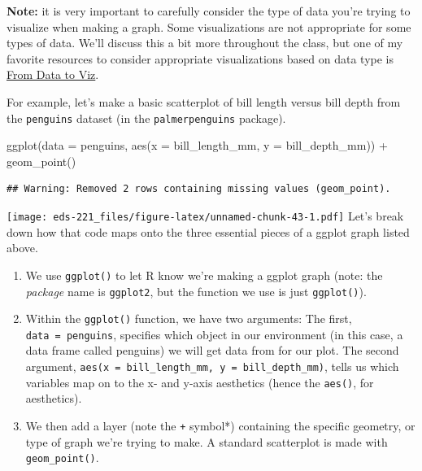 \documentclass[
]{book}
\newenvironment{Shaded}{\begin{snugshade}}{\end{snugshade}}
\newcommand{\AttributeTok}[1]{\textcolor[rgb]{0.77,0.63,0.00}{#1}}
\newcommand{\FunctionTok}[1]{\textcolor[rgb]{0.00,0.00,0.00}{#1}}
\newcommand{\NormalTok}[1]{#1}
\newcommand{\SpecialCharTok}[1]{\textcolor[rgb]{0.00,0.00,0.00}{#1}}
\providecommand{\tightlist}{%
  \setlength{\itemsep}{0pt}\setlength{\parskip}{0pt}}
\begin{document}
\textbf{Note:} it is very important to carefully consider the type of data you're trying to visualize when making a graph. Some visualizations are not appropriate for some types of data. We'll discuss this a bit more throughout the class, but one of my favorite resources to consider appropriate visualizations based on data type is \href{data-to-viz.com}{From Data to Viz}.

For example, let's make a basic scatterplot of bill length versus bill depth from the \texttt{penguins} dataset (in the \texttt{palmerpenguins} package).

\begin{Shaded}
\begin{Highlighting}[]
\FunctionTok{ggplot}\NormalTok{(}\AttributeTok{data =}\NormalTok{ penguins, }\FunctionTok{aes}\NormalTok{(}\AttributeTok{x =}\NormalTok{ bill\_length\_mm, }\AttributeTok{y =}\NormalTok{ bill\_depth\_mm)) }\SpecialCharTok{+}
  \FunctionTok{geom\_point}\NormalTok{()}
\end{Highlighting}
\end{Shaded}

\begin{verbatim}
## Warning: Removed 2 rows containing missing values (geom_point).
\end{verbatim}

\texttt{[image: eds-221\_files/figure-latex/unnamed-chunk-43-1.pdf]}
Let's break down how that code maps onto the three essential pieces of a ggplot graph listed above.

\begin{enumerate}
\def\labelenumi{\arabic{enumi}.}
\tightlist
\item
  We use \texttt{ggplot()} to let R know we're making a ggplot graph (note: the \emph{package} name is \texttt{ggplot2}, but the function we use is just \texttt{ggplot()}).
\item
  Within the \texttt{ggplot()} function, we have two arguments: The first, \texttt{data\ =\ penguins}, specifies which object in our environment (in this case, a data frame called penguins) we will get data from for our plot. The second argument, \texttt{aes(x\ =\ bill\_length\_mm,\ y\ =\ bill\_depth\_mm)}, tells us which variables map on to the x- and y-axis aesthetics (hence the \texttt{aes()}, for aesthetics).
\item
  We then add a layer (note the \texttt{+} symbol*) containing the specific geometry, or type of graph we're trying to make. A standard scatterplot is made with \texttt{geom\_point()}.
\end{enumerate}
\end{document}
